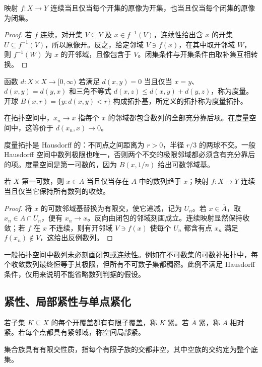 \begin{proposition}[连续性的等价条件]\label{prop:y0-continuity}
映射 $f:X\to Y$ 连续当且仅当每个开集的原像为开集，也当且仅当每个闭集的原像为闭集。
\end{proposition}
\begin{proof}
若 $f$ 连续，对开集 $V\subseteq Y$ 及 $x\in f^{-1}(V)$，连续性给出含 $x$ 的开集 $U\subseteq f^{-1}(V)$，所以原像开。反之，给定邻域 $V\ni f(x)$，在其中取开邻域 $W$，则 $f^{-1}(W)$ 为 $x$ 的开邻域，且像包含于 $V$。闭集条件与开集条件由取补集互相转换。
\end{proof}

\begin{definition}[度量与收敛]\label{def:y0-metric}
函数 $d:X\times X\to[0,\infty)$ 若满足 $d(x,y)=0$ 当且仅当 $x=y$、$d(x,y)=d(y,x)$ 和三角不等式 $d(x,z)\le d(x,y)+d(y,z)$，称为度量。开球 $B(x,r)=\{y:d(x,y)<r\}$ 构成拓扑基，所定义的拓扑称为度量拓扑。

在拓扑空间中，$x_n\to x$ 指每个 $x$ 的邻域都包含数列的全部充分靠后项。在度量空间中，这等价于 $d(x_n,x)\to0$。
\end{definition}

度量拓扑是 Hausdorff 的：不同点之间距离为 $r>0$，半径 $r/3$ 的两球不交。一般 Hausdorff 空间中数列极限也唯一，否则两个不交的极限邻域都必须含有充分靠后的项。度量空间是第一可数的，因为 $B(x,1/n)$ 给出可数邻域基。

\begin{proposition}[第一可数空间中的数列判据]\label{prop:y0-sequential}
若 $X$ 第一可数，则 $x\in\overline A$ 当且仅当存在 $A$ 中的数列趋于 $x$；映射 $f:X\to Y$ 连续当且仅当它保持所有数列的收敛。
\end{proposition}
\begin{proof}
将 $x$ 的可数邻域基替换为有限交，使它递减，记为 $U_n$。若 $x\in\overline A$，取 $x_n\in A\cap U_n$，便有 $x_n\to x$。反向由闭包的邻域刻画成立。连续映射显然保持收敛；若 $f$ 在 $x$ 不连续，则有开邻域 $V\ni f(x)$ 使每个 $U_n$ 都含有点 $x_n$ 满足 $f(x_n)\notin V$，这给出反例数列。
\end{proof}

一般拓扑空间中数列未必刻画闭包或连续性。例如在不可数集的可数补拓扑中，每个收敛数列最终恒等于其极限，但所有不可数子集都稠密。此例不满足 Hausdorff 条件，仅用来说明不能省略数列判据的假设。

\subsection{紧性、局部紧性与单点紧化}
\begin{definition}[紧性与相对紧性]\label{def:y0-compact}
若子集 $K\subseteq X$ 的每个开覆盖都有有限子覆盖，称 $K$ 紧。若 $\overline A$ 紧，称 $A$ 相对紧。若每个点都具有紧邻域，称空间局部紧。

集合族具有有限交性质，指每个有限子族的交都非空，其中空族的交约定为整个底集。
\end{definition}

